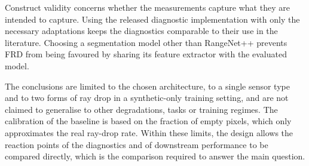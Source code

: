 Construct validity concerns whether the measurements capture what they are intended to capture. Using the released diagnostic implementation with only the necessary adaptations keeps the diagnostics comparable to their use in the literature. Choosing a segmentation model other than RangeNet++ prevents FRD from being favoured by sharing its feature extractor with the evaluated model.

The conclusions are limited to the chosen architecture, to a single sensor type and to two forms of ray drop in a synthetic-only training setting, and are not claimed to generalise to other degradations, tasks or training regimes. The calibration of the baseline is based on the fraction of empty pixels, which only approximates the real ray-drop rate. Within these limits, the design allows the reaction points of the diagnostics and of downstream performance to be compared directly, which is the comparison required to answer the main question.